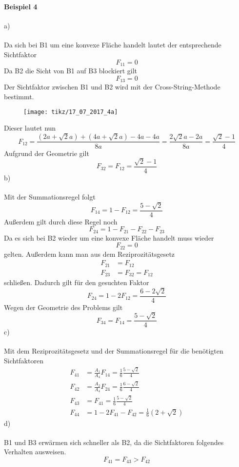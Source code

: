 \textbf{Beispiel 4}\\ \\
a) \\ \\
Da sich bei B1 um eine konvexe Fläche handelt lautet der entsprechende Sichtfaktor
\[
	F_{11} = 0
\]
Da B2 die Sicht von B1 auf B3 blockiert gilt
\[
	F_{13} = 0
\]
Der Sichtfaktor zwischen B1 und B2 wird mit der Cross-String-Methode bestimmt.
\begin{figure}[h]
	\centering
	\texttt{[image: tikz/17\_07\_2017\_4a]}
\end{figure}
Dieser lautet nun
\[
	F_{12} = \frac{(2a + \sqrt{2}a) + (4a + \sqrt{2}a) - 4a - 4a}{8a} = \frac{2\sqrt{2}a - 2a}{8a} = \frac{\sqrt{2} - 1}{4}
\]
Aufgrund der Geometrie gilt
\[
		F_{32} = F_{12} = \frac{\sqrt{2} - 1}{4}
\]
b) \\ \\
Mit der Summationsregel folgt
\[
	F_{14} = 1 - F_{12} = \frac{5 - \sqrt{2}}{4}
\]
Außerdem gilt durch diese Regel noch
\[
	F_{24} = 1 - F_{21} - F_{22} - F_{23}
\]
\newpage
\noindent
Da es sich bei B2 wieder um eine konvexe Fläche handelt muss wieder
\[
	F_{22} = 0
\]
gelten. Außerdem kann man aus dem Reziprozitätsgesetz
\begin{align*}
	F_{21} &= F_{12}  \\
	F_{23} &= F_{32} = F_{12}
\end{align*}
schließen. Dadurch gilt für den gesuchten Faktor
\[
	F_{24} = 1 - 2F_{12} = \frac{6 - 2\sqrt{2}}{4}
\]
Wegen der Geometrie des Problems gilt
\[
	F_{34} = F_{14} = \frac{5 - \sqrt{2}}{4}
\]
c)\\ \\
Mit dem Reziprozitätsgesetz und der Summationsregel für die benötigten Sichtfaktoren
\begin{align*}
	F_{41} &= \frac{A_1}{A_4}F_{14} = \frac{1}{6}\frac{5 - \sqrt{2}}{4} \\
	F_{42} &= \frac{A_2}{A_4}F_{24} = \frac{1}{6}\frac{6 - \sqrt{2}}{4} \\
	F_{43} &= F_{41} = \frac{1}{6}\frac{5 - \sqrt{2}}{4} \\
	F_{44} &= 1 - 2F_{41} - F_{42} = \frac{1}{6}(2 + \sqrt{2})
\end{align*}
d)\\ \\
B1 und B3 erwärmen sich schneller als B2, da die Sichtfaktoren folgendes Verhalten ausweisen.
\[
	F_{41} = F_{43} > F_{42}
\]